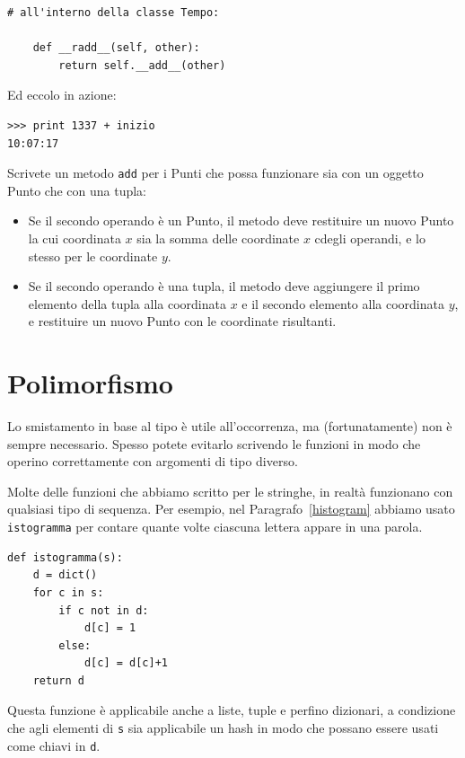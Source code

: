 \documentclass[10pt]{book}
\begin{document}
\begin{verbatim}
# all'interno della classe Tempo:

    def __radd__(self, other):
        return self.__add__(other)
\end{verbatim}
%
Ed eccolo in azione:

\begin{verbatim}
>>> print 1337 + inizio
10:07:17
\end{verbatim}
%
\vspace{0.2in}
\begin{exercise}

Scrivete un metodo {\tt add} per i Punti che possa funzionare sia con un oggetto Punto che con una tupla:  

\begin{itemize}

\item Se il secondo operando è un Punto, il metodo deve restituire un nuovo Punto la cui coordinata $x$ sia la somma delle coordinate $x$ cdegli operandi, e lo stesso per le coordinate $y$.

\item Se il secondo operando è una tupla, il metodo deve aggiungere il primo elemento della tupla alla coordinata $x$ e il secondo elemento alla coordinata $y$, e restituire un nuovo Punto con le coordinate risultanti.

\end{itemize}

\end{exercise}

\section{Polimorfismo}

Lo smistamento in base al tipo è utile all'occorrenza, ma (fortunatamente) non è sempre necessario. Spesso potete evitarlo scrivendo le funzioni in modo che operino correttamente con argomenti di tipo diverso.

Molte delle funzioni che abbiamo scritto per le stringhe, in realtà funzionano con qualsiasi tipo di sequenza.
Per esempio, nel Paragrafo~\ref{histogram}
abbiamo usato {\tt istogramma} per contare quante volte ciascuna lettera appare in una parola.

\begin{verbatim}
def istogramma(s):
    d = dict()
    for c in s:
        if c not in d:
            d[c] = 1
        else:
            d[c] = d[c]+1
    return d
\end{verbatim}
%
Questa funzione è applicabile anche a liste, tuple e perfino dizionari, a condizione che agli elementi di {\tt s} sia applicabile un hash in modo che possano essere usati come chiavi in {\tt d}.
\end{document}
